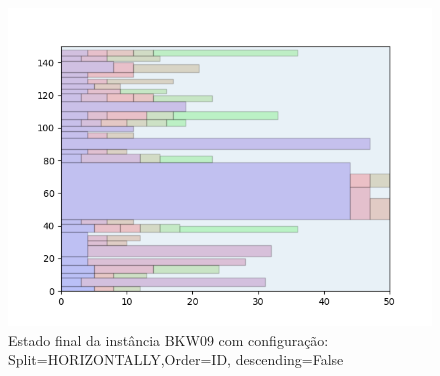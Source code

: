 \begin{figure}[H]
    \centering
    \caption[]{Estado final da instância BKW09 com configuração: Split=HORIZONTALLY,Order=ID, descending=False}
    \label{fig:bkw09-horizontally-id-false}
    \includegraphics[scale=0.5]{output/figures/bkw/bkw09/horizontally/id/false/000}
\end{figure}